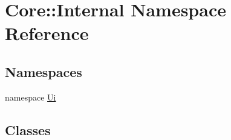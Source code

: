 \hypertarget{namespace_core_1_1_internal}{\section{\-Core\-:\-:\-Internal \-Namespace \-Reference}
\label{namespace_core_1_1_internal}
}
\subsection*{\-Namespaces}
\begin{DoxyCompactItemize}
\item 
namespace \hyperlink{namespace_core_1_1_internal_1_1_ui}{\-Ui}
\end{DoxyCompactItemize}
\subsection*{\-Classes}
